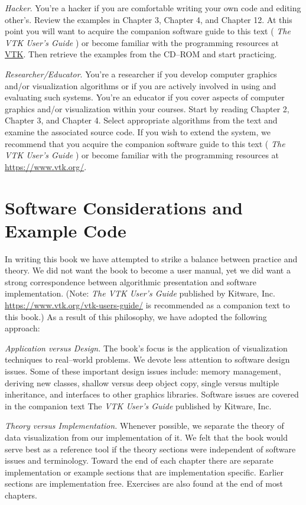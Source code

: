 \emph{Hacker}. You're a hacker if you are comfortable writing your own code and editing other's. Review the examples in Chapter 3, Chapter 4, and Chapter 12. At this point you will want to acquire the companion software guide to this text ( \emph{The VTK User's Guide} ) or become familiar with the programming resources at \href{https://www.vtk.org/}{VTK}. Then retrieve the examples from the CD--ROM and start practicing.

\emph{Researcher/Educator}. You're a researcher if you develop computer graphics and/or visualization algorithms or if you are actively involved in using and evaluating such systems. You're an educator if you cover aspects of computer graphics and/or visualization within your courses. Start by reading Chapter 2, Chapter 3, and Chapter 4. Select appropriate algorithms from the text and examine the associated source code. If you wish to extend the system, we recommend that you acquire the companion software guide to this text ( \emph{The VTK User's Guide} ) or become familiar with the programming resources at \href{https://www.vtk.org/}{https://www.vtk.org/}.

\section{Software Considerations and Example Code}

In writing this book we have attempted to strike a balance between practice and theory. We did not want the book to become a user manual, yet we did want a strong correspondence between algorithmic presentation and software implementation. (Note: \emph{The VTK User's Guide} published by Kitware, Inc. \href{https://www.vtk.org/vtk-users-guide/}{https://www.vtk.org/vtk-users-guide/} is recommended as a companion text to this book.) As a result of this philosophy, we have adopted the following approach:

\emph{Application versus Design.} The book's focus is the application of visualization techniques to real--world problems. We devote less attention to software design issues. Some of these important design issues include: memory management, deriving new classes, shallow versus deep object copy, single versus multiple inheritance, and interfaces to other graphics libraries. Software issues are covered in the companion text The \emph{VTK User's Guide} published by Kitware, Inc.

\textit{Theory versus Implementation.} Whenever possible, we separate the theory of data visualization from our implementation of it. We felt that the book would serve best as a reference tool if the theory sections were independent of software issues and terminology. Toward the end of each chapter there are separate implementation or example sections that are implementation specific. Earlier sections are implementation free. Exercises are also found at the end of most chapters.

